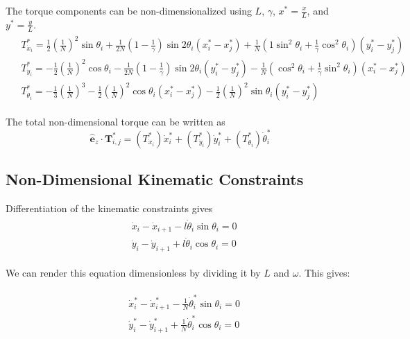 \documentclass[12pt,letterpaper,titlepage]{article}
\newcommand{\uvec}[1]{\mathbf{\hat{#1}}}
\begin{document}
The torque components can be non-dimensionalized using $L$, $\gamma$, $x^* = \frac{x}{L}$, and $y^* = \frac{y}{L}$.
\begin{align}
\begin{split}
&T_{\dot{x}_i}^* = \frac{1}{2} (\frac{1}{N})^2 \sin \theta_i + \frac{1}{2N} (1 - \frac{1}{\gamma}) \sin 2 \theta_i (x_i^* - x_j^*) + \frac{1}{N} (1 \sin^2 \theta_i + \frac{1}{\gamma} \cos^2 \theta_i)(y_i^* - y_j^*) \\
&T_{\dot{y}_i}^* = - \frac{1}{2} (\frac{1}{N})^2 \cos \theta_i - \frac{1}{2N} (1 - \frac{1}{\gamma}) \sin 2 \theta_i (y_i^* - y_j^*) - \frac{1}{N} (\cos^2 \theta_i + \frac{1}{\gamma} \sin^2 \theta_i)(x_i^* - x_j^*) \\
&T_{\dot{\theta}_i}^* = - \frac{1}{3} (\frac{1}{N})^3 - \frac{1}{2} (\frac{1}{N})^2 \cos \theta_i (x_i^* - x_j^*) - \frac{1}{2} (\frac{1}{N})^2 \sin \theta_i (y_i^* - y_j^*)
\end{split}
\end{align}

The total non-dimensional torque can be written as
\begin{equation}
\uvec{e}_z \cdot \mathbf{T}_{i,j}^* = (T_{\dot{x}_i}^*) \dot{x}_i^* + (T_{\dot{y}_i}^*) \dot{y}_i^* + (T_{\dot{\theta}_i}^*) \dot{\theta}_i^*
\end{equation}

\newpage

\subsection{Non-Dimensional Kinematic Constraints}
Differentiation of the kinematic constraints gives
\begin{align}
\begin{split}
& \dot{x}_i - \dot{x}_{i+1} - l \dot{\theta}_i \sin \theta_i = 0 \\
& \dot{y}_i - \dot{y}_{i+1} + l \dot{\theta}_i \cos \theta_i = 0
\end{split}
\end{align}

We can render this equation dimensionless by dividing it by $L$ and $\omega$. This gives:

\begin{align}
\begin{split}
& \dot{x}_i^* - \dot{x}_{i+1}^* - \frac{1}{N} \dot{\theta}_i^* \sin \theta_i = 0 \\
& \dot{y}_i^* - \dot{y}_{i+1}^* + \frac{1}{N} \dot{\theta}_i^* \cos \theta_i = 0
\end{split}
\end{align}
\end{document}
